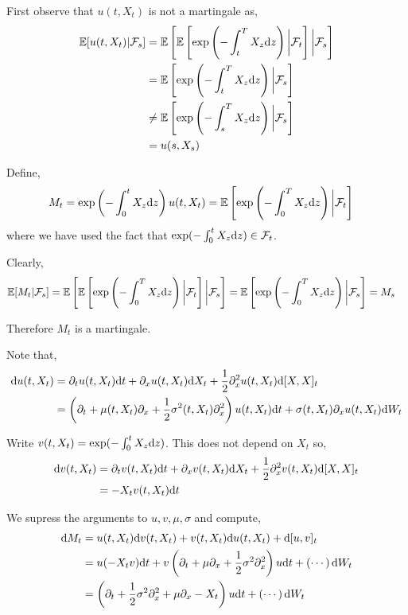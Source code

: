 \begin{solution}
    First observe that \( u(t,X_t) \) is not a martingale as,
\begin{align*}
    \mathbb{E}[u(t,X_t) | \mathcal{F}_s] 
    &= \mathbb{E} \left[ \mathbb{E} \left[ \exp \left( -\int_t^T X_z\mathrm{d} z \right) \bigg| \mathcal{F}_t \right] \bigg| \mathcal{F}_s \right]
    \\&= \mathbb{E} \left[ \exp \left( -\int_t^T X_z\mathrm{d} z \right) \bigg| \mathcal{F}_s \right]
    \\&\neq \mathbb{E} \left[ \exp \left( -\int_s^T X_z\mathrm{d} z \right) \bigg| \mathcal{F}_s \right]
    \\&= u(s,X_s)
\end{align*}

Define,
\begin{align*}
    M_t &= \exp \left( -\int_0^t X_z\mathrm{d} z \right) u(t,X_t)
    = \mathbb{E} \left[ \exp \left( -\int_0^T X_z\mathrm{d} z \right) \bigg| \mathcal{F}_t \right]
\end{align*}
    where we have used the fact that \( \exp(-\int_0^t X_z\mathrm{d} z) \in \mathcal{F}_t \).

Clearly,
\begin{align*}
    \mathbb{E}[M_t|\mathcal{F}_s] 
    &= \mathbb{E} \left[ \mathbb{E} \left[ \exp \left( -\int_0^T X_z\mathrm{d} z \right) \bigg| \mathcal{F}_t \right] \bigg|\mathcal{F}_s \right]
    = \mathbb{E} \left[ \exp \left( -\int_0^T X_z\mathrm{d} z \right) \bigg| \mathcal{F}_s \right]
    = M_s
\end{align*}

    Therefore \( M_t \) is a martingale.

    Note that,
    \begin{align*}
        \mathrm{d} u(t,X_t) &= \partial_t u(t,X_t) \mathrm{d} t + \partial_x u(t,X_t) \mathrm{d} X_t + \frac{1}{2} \partial_x^2 u(t,X_t) \mathrm{d}[X,X]_t 
        \\&= \left(\partial_t + \mu(t,X_t) \partial_x + \frac{1}{2}\sigma^2(t,X_t) \partial_x^2 \right) u(t,X_t) \mathrm{d} t + \sigma(t,X_t) \partial_x u(t,X_t)\mathrm{d} W_t
    \end{align*}
    
    Write \( v(t,X_t) = \exp(-\int_0^t X_z\mathrm{d} z) \). This does not depend on \( X_t \) so,
    \begin{align*}
        \mathrm{d} v(t,X_t) &= 
        \partial_t v(t,X_t) \mathrm{d} t + \partial_x v(t,X_t) \mathrm{d} X_t + \frac{1}{2} \partial_x^2 v(t,X_t) \mathrm{d}[X,X]_t
        \\&= -X_t v(t,X_t) \mathrm{d} t
    \end{align*}

    We supress the arguments to \( u,v,\mu,\sigma \) and compute,
\begin{align*}
    \mathrm{d} M_t &= u(t,X_t) \mathrm{d} v(t,X_t) + v(t,X_t) \mathrm{d} u(t,X_t) + \mathrm{d}[u,v]_t 
    \\&= u(-X_t v)\mathrm{d} t + v \left( \partial_t + \mu \partial_x + \frac{1}{2}\sigma^2\partial_x^2 \right) u \mathrm{d} t + \left( \cdots \right)\mathrm{d} W_t 
    \\&= \left( \partial_t + \frac{1}{2}\sigma^2\partial_x^2 + \mu \partial_x - X_t \right)u \mathrm{d} t + \left( \cdots \right)\mathrm{d} W_t
\end{align*}


\end{solution}
